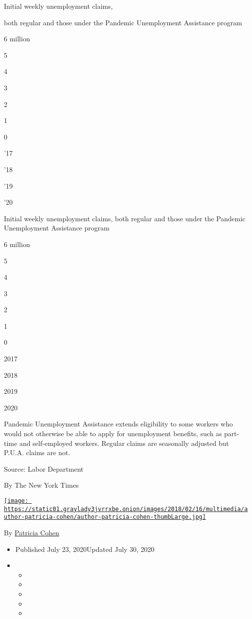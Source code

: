 Initial weekly unemployment claims,

both regular and those under the Pandemic Unemployment Assistance
program

6 million

5

4

3

2

1

0

'17

'18

'19

'20

Initial weekly unemployment claims, both regular and those under the
Pandemic Unemployment Assistance program

6 million

5

4

3

2

1

0

2017

2018

2019

2020

Pandemic Unemployment Assistance extends eligibility to some workers who
would not otherwise be able to apply for unemployment benefits, such as
part-time and self-employed workers. Regular claims are seasonally
adjusted but P.U.A. claims are not.

Source: Labor Department

By The New York Times

\href{https://www.nytimes3xbfgragh.onion/by/patricia-cohen}{\texttt{[image: https://static01.graylady3jvrrxbe.onion/images/2018/02/16/multimedia/author-patricia-cohen/author-patricia-cohen-thumbLarge.jpg]}}

By \href{https://www.nytimes3xbfgragh.onion/by/patricia-cohen}{Patricia
Cohen}

\begin{itemize}
\item
  Published July 23, 2020Updated July 30, 2020
\item
  \begin{itemize}
  \item
  \item
  \item
  \item
  \item
  \end{itemize}
\end{itemize}

